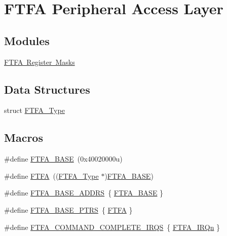 \hypertarget{group___f_t_f_a___peripheral___access___layer}{}\section{F\+T\+FA Peripheral Access Layer}
\label{group___f_t_f_a___peripheral___access___layer}
\subsection*{Modules}
\begin{DoxyCompactItemize}
\item 
\mbox{\hyperlink{group___f_t_f_a___register___masks}{F\+T\+F\+A Register Masks}}
\end{DoxyCompactItemize}
\subsection*{Data Structures}
\begin{DoxyCompactItemize}
\item 
struct \mbox{\hyperlink{struct_f_t_f_a___type}{F\+T\+F\+A\+\_\+\+Type}}
\end{DoxyCompactItemize}
\subsection*{Macros}
\begin{DoxyCompactItemize}
\item 
\#define \mbox{\hyperlink{group___f_t_f_a___peripheral___access___layer_gaa2b2cdc953f8c4bfc44977ac97c1ca3a}{F\+T\+F\+A\+\_\+\+B\+A\+SE}}~(0x40020000u)
\item 
\#define \mbox{\hyperlink{group___f_t_f_a___peripheral___access___layer_ga51932e698139405f75ed323a8bc0bbb8}{F\+T\+FA}}~((\mbox{\hyperlink{struct_f_t_f_a___type}{F\+T\+F\+A\+\_\+\+Type}} $\ast$)\mbox{\hyperlink{group___f_t_f_a___peripheral___access___layer_gaa2b2cdc953f8c4bfc44977ac97c1ca3a}{F\+T\+F\+A\+\_\+\+B\+A\+SE}})
\item 
\#define \mbox{\hyperlink{group___f_t_f_a___peripheral___access___layer_ga28d40395dc31038db1be1208dd23fe92}{F\+T\+F\+A\+\_\+\+B\+A\+S\+E\+\_\+\+A\+D\+D\+RS}}~\{ \mbox{\hyperlink{group___f_t_f_a___peripheral___access___layer_gaa2b2cdc953f8c4bfc44977ac97c1ca3a}{F\+T\+F\+A\+\_\+\+B\+A\+SE}} \}
\item 
\#define \mbox{\hyperlink{group___f_t_f_a___peripheral___access___layer_ga3f06770a713a2c02c4eec6b98daefd7e}{F\+T\+F\+A\+\_\+\+B\+A\+S\+E\+\_\+\+P\+T\+RS}}~\{ \mbox{\hyperlink{group___f_t_f_a___peripheral___access___layer_ga51932e698139405f75ed323a8bc0bbb8}{F\+T\+FA}} \}
\item 
\#define \mbox{\hyperlink{group___f_t_f_a___peripheral___access___layer_ga2038132a82db8c41df57436b93a52911}{F\+T\+F\+A\+\_\+\+C\+O\+M\+M\+A\+N\+D\+\_\+\+C\+O\+M\+P\+L\+E\+T\+E\+\_\+\+I\+R\+QS}}~\{ \mbox{\hyperlink{group___interrupt__vector__numbers_gga666eb0caeb12ec0e281415592ae89083a48ae373dabf0b833defec3f0c5f0e029}{F\+T\+F\+A\+\_\+\+I\+R\+Qn}} \}
\end{DoxyCompactItemize}


